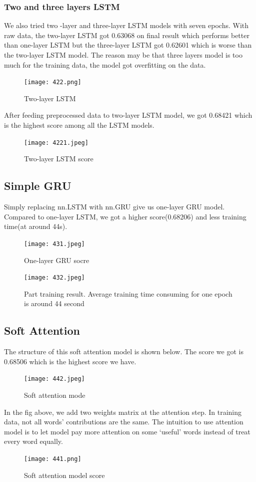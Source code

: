 \documentclass{article}
\begin{document}
\subsubsection{ Two and three layers LSTM}
\noindent We also tried two -layer and three-layer LSTM models with seven epochs. With raw data, the two-layer LSTM got 0.63068 on final result which performs better than one-layer LSTM but the three-layer LSTM got 0.62601 which is worse than the two-layer LSTM model. The reason may be that three layers model is too much for the training data, the model got overfitting on the data.\\
\begin{figure}[H]
	\centering
	\texttt{[image: 422.png]}
	\caption{Two-layer LSTM}
\end{figure}
\noindent After feeding preprocessed data to two-layer LSTM model, we got 0.68421 which is the highest score among all the LSTM models.\\
	\begin{figure}[H]
		\centering
		\texttt{[image: 4221.jpeg]}
		\caption{ Two-layer LSTM score }
	\end{figure}
\subsection{Simple GRU}
\noindent Simply replacing nn.LSTM with nn.GRU give us one-layer GRU model. Compared to one-layer LSTM, we got a higher score(0.68206) and less training time(at around 44s).\\
	\begin{figure}[H]
	\centering
	\texttt{[image: 431.jpeg]}
	\caption{ One-layer GRU socre}
\end{figure}
\begin{figure}[H]
	\centering
	\texttt{[image: 432.jpeg]}
	\caption{Part training result. Average training time consuming for one epoch is around 44 second}
\end{figure}
\subsection{Soft Attention}
\noindent The structure of this soft attention model is shown below. The score we got is 0.68506 which is the highest score we have.\\
\begin{figure}[H]
	\centering
	\texttt{[image: 442.jpeg]}
	\caption{Soft attention mode}
\end{figure}
\noindent In the fig above, we add two weights matrix at the attention step. In training data, not all words’ contributions are the same. The intuition to use attention model is to let model pay more attention on some ‘useful’ words instead of treat every word equally.\\
\begin{figure}[H]
	\centering
	\texttt{[image: 441.png]}
	\caption{Soft attention model score}
\end{figure}
\end{document}
